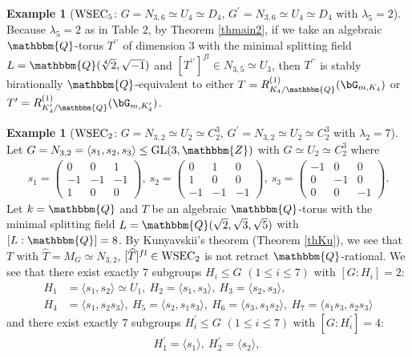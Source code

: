 \documentclass{amsart}
\theoremstyle{plain}
\theoremstyle{definition}
\newtheorem{example}[theorem]{Example}
\theoremstyle{remark}
\newcommand{\bZ}{\mathbbm{Z}}\newcommand{\bQ}{\mathbbm{Q}}
\newcounter{sub}\def\tr{\mbox{tr }}
\begin{document}
\begin{example}[${\rm WSEC}_5$: $G=N_{3,6}\simeq U_4\simeq D_4$, $G^\prime=N_{3,6}\simeq U_4\simeq D_4$ with $\lambda_5=2$]
Because $\lambda_5=2$ as in Table $2$, by Theorem \ref{thmain2}, 
if we take an algebraic $\bQ$-torus 
$T^{\prime\prime}$ of dimension $3$ with 
the minimal splitting field $L=\bQ(\sqrt[4]{2},\sqrt{-1})$ and 
$[T^{\prime\prime}]^{fl}\in N_{3,5}\simeq U_3$, 
then $T^{\prime\prime}$ is stably birationally 
$\bQ$-equivalent to either $T=R_{K_4/\bQ}^{(1)}(\bG_{m,K_4})$ or 
$T^\prime=R_{K_4^\prime/\bQ}^{(1)}(\bG_{m,K_4^\prime})$.
\end{example}
%
\begin{example}[${\rm WSEC}_2$: $G=N_{3,2}\simeq U_2\simeq C_2^3$, $G^\prime=N_{3,2}\simeq U_2\simeq C_2^3$ with $\lambda_2=7$]\label{exU2}
Let $G=N_{3,2}=\langle s_1, s_2, s_3\rangle\leq {\rm GL}(3,\bZ)$ 
with $G\simeq U_2\simeq C_2^3$ where 
\begin{align*}
s_1=\left(
\begin{array}{ccc}
0&0&1\\
-1&-1&-1\\
1&0&0
\end{array}\right),\ 
s_2=\left(
\begin{array}{ccc}
0&1&0\\
1&0&0\\
-1&-1&-1
\end{array}\right),\ 
s_3=\left(
\begin{array}{ccc}
-1&0&0\\
0&-1&0\\
0&0&-1
\end{array}\right). 
\end{align*}
%
Let $k=\bQ$ and 
$T$ be an algebraic $\bQ$-torus with the minimal splitting field 
$L=\bQ(\sqrt{2},\sqrt{3},\sqrt{5})$ with $[L:\bQ]=8$. 
%
By Kunyavskii's theorem (Theorem \ref{thKu}), 
we see that $T$ with $\widehat{T}=M_G\simeq N_{3,2}$, 
$[\widehat{T}]^{fl}\in {\rm WSEC}_2$ 
is not retract $\bQ$-rational. 
%
We see that there exist exactly $7$ subgroups $H_i\leq G$ $(1\leq i\leq 7)$ 
with $[G:H_i]=2$: 
\begin{align*}
H_1&=\langle s_1, s_2\rangle\simeq U_1,\ 
H_2=\langle s_1, s_3\rangle,\ 
H_3=\langle s_2, s_3\rangle,\\ 
H_4&=\langle s_1, s_2s_3\rangle,\ 
H_5=\langle s_2, s_1s_3\rangle,\ 
H_6=\langle s_3, s_1s_2\rangle,\ 
H_7=\langle s_1s_3, s_2s_3\rangle 
\end{align*}
and 
there exist exactly $7$ subgroups $H_i^\prime\leq G$ $(1\leq i\leq 7)$ 
with $[G:H_i^\prime]=4$: 
\begin{align*}
H_1^\prime=\langle s_1\rangle,\ 
H_2^\prime=\langle s_2\rangle,\ 

\end{align*}
\end{example}
\end{document}
